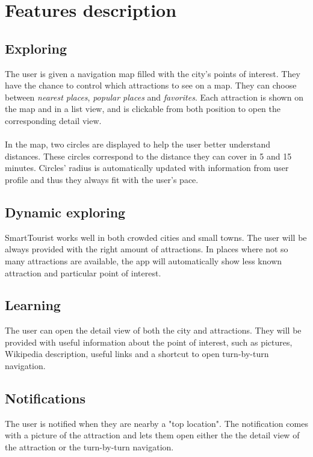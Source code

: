 \documentclass[a4paper, 11pt, parskip=half]{scrreprt}
\theoremstyle{definition}
\begin{document}
\section{Features description}

\subsection{Exploring}
The user is given a navigation map filled with the city's points of interest. They have the chance to control which attractions to see on a map. They can choose between \textit{nearest places}, \textit{popular places} and \textit{favorites}. Each attraction is shown on the map and in a list view, and is clickable from both position to open the corresponding detail view.
\\\\In the map, two circles are displayed to help the user better understand distances. These circles correspond to the distance they can cover in 5 and 15 minutes. Circles' radius is automatically updated with information from user profile and thus they always fit with the user's pace.

\subsection{Dynamic exploring}
SmartTourist works well in both crowded cities and small towns. The user will be always provided with the right amount of attractions. In places where not so many attractions are available, the app will automatically show less known attraction and particular point of interest.

\subsection{Learning}
The user can open the detail view of both the city and attractions. They will be provided with useful information about the point of interest, such as pictures, Wikipedia description, useful links and a shortcut to open turn-by-turn navigation.

\subsection{Notifications}
The user is notified when they are nearby a "top location". The notification comes with a picture of the attraction and lets them open either the the detail view of the attraction or the turn-by-turn navigation. 
\end{document}
